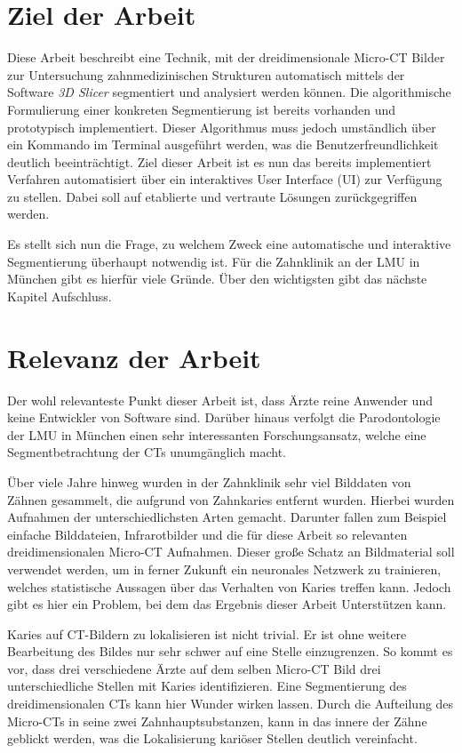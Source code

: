\section{Ziel der Arbeit}
\label{sec:ziel_der_arbeit} Diese Arbeit beschreibt eine Technik, mit der
dreidimensionale Micro-CT Bilder zur Untersuchung zahnmedizinischen Strukturen
automatisch mittels der Software \textit{3D Slicer} segmentiert und analysiert werden
können. Die algorithmische Formulierung einer konkreten Segmentierung ist
bereits vorhanden und prototypisch implementiert. Dieser Algorithmus muss jedoch
umständlich über ein Kommando im Terminal ausgeführt werden, was die
Benutzerfreundlichkeit deutlich beeinträchtigt. Ziel dieser Arbeit ist es nun das
bereits implementiert Verfahren automatisiert über ein interaktives User Interface
(UI) zur Verfügung zu stellen. Dabei soll auf etablierte und vertraute Lösungen
zurückgegriffen werden.

Es stellt sich nun die Frage, zu welchem Zweck eine automatische und interaktive
Segmentierung überhaupt notwendig ist. Für die Zahnklinik an der LMU in München
gibt es hierfür viele Gründe. Über den wichtigsten gibt das nächste Kapitel Aufschluss.

\section{Relevanz der Arbeit}
\label{sec:relevanz_der_arbeit} Der wohl relevanteste Punkt dieser Arbeit ist,
dass Ärzte reine Anwender und keine Entwickler von Software sind. Darüber hinaus
verfolgt die Parodontologie der LMU in München einen sehr interessanten Forschungsansatz,
welche eine Segmentbetrachtung der CTs unumgänglich macht.

Über viele Jahre hinweg wurden in der Zahnklinik sehr viel Bilddaten von Zähnen
gesammelt, die aufgrund von Zahnkaries entfernt wurden. Hierbei wurden Aufnahmen
der unterschiedlichsten Arten gemacht. Darunter fallen zum Beispiel einfache Bilddateien,
Infrarotbilder und die für diese Arbeit so relevanten dreidimensionalen Micro-CT
Aufnahmen. Dieser große Schatz an Bildmaterial soll verwendet werden, um in
ferner Zukunft ein neuronales Netzwerk zu trainieren, welches statistische Aussagen
über das Verhalten von Karies treffen kann. Jedoch gibt es hier ein Problem, bei
dem das Ergebnis dieser Arbeit Unterstützen kann.

Karies auf CT-Bildern zu lokalisieren ist nicht trivial. Er ist ohne weitere
Bearbeitung des Bildes nur sehr schwer auf eine Stelle einzugrenzen. So kommt es
vor, dass drei verschiedene Ärzte auf dem selben Micro-CT Bild drei
unterschiedliche Stellen mit Karies identifizieren. Eine Segmentierung des dreidimensionalen
CTs kann hier Wunder wirken lassen. Durch die Aufteilung des Micro-CTs in seine
zwei Zahnhauptsubstanzen, kann in das innere der Zähne geblickt werden, was die Lokalisierung
kariöser Stellen deutlich vereinfacht.

